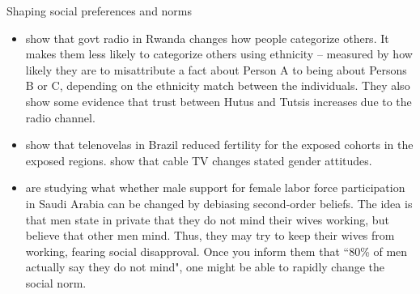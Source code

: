 \documentclass[aspectratio=169, 10pt, handout]{beamer}
\begin{document}
\begin{frame}{Shaping social preferences and norms}
{\begin{itemize}
        \item \cite{blouin2017erasing} show that govt radio in Rwanda changes how people categorize others. It makes them less likely to categorize others using ethnicity -- measured by how likely they are to misattribute a fact about Person A to being about Persons B or C, depending on the ethnicity match between the individuals. They also show some evidence that trust between Hutus and Tutsis increases due to the radio channel. 

        \item \cite{la2012soap} show that telenovelas in Brazil reduced fertility for the exposed cohorts in the exposed regions. \cite{jensen2009power} show that cable TV changes stated gender attitudes. 

        \item \cite{bursztyn2018misperceived} are studying what whether male support for female labor force participation in Saudi Arabia can be changed by debiasing second-order beliefs. The idea is that men state in private that they do not mind their wives working, but believe that other men mind. Thus, they may try to keep their wives from working, fearing social disapproval. Once you inform them that ``80\% of men actually say they do not mind", one might be able to rapidly change the social norm. 

    \end{itemize}

}

\end{frame}
\end{document}
